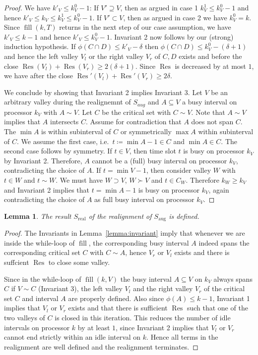 \documentclass[a4paper]{article}
\DeclareMathOperator{\aug}{aug}
\DeclareMathOperator{\real}{real}
\DeclareMathOperator{\fillop}{fill}
\DeclareMathOperator{\res}{Res}
\newtheorem{lemma}[theorem]{Lemma}
\begin{document}
\begin{proof}
      We have $k'_V \leq k^0_V - 1$:
      If $V' \supseteq V$, then as argued in case 1 $k^1_V \leq k^0_V - 1$ and hence $k'_V \leq k_V \leq k^1_V \leq k^0_V -1$.
      If $V' \subset V$, then as argued in case 2 we have $k^0_V = k$.
      Since $\fillop(k, T)$ returns in the next step of our case assumption, we have $k'_V \leq k - 1$ and hence $k'_V \leq k^0_V -1$.
      Invariant 2 now follows by our (strong) induction hypothesis.
      If $\phi(C \cap D) \leq k'_V - \delta$ then $\phi(C \cap D) \leq k^0_V - (\delta + 1)$ and hence the left valley $V_l$ or the right valley $V_r$ of $C, D$ exists and before the close $\res(V_l) + \res(V_r) \geq 2 (\delta + 1)$.
      Since $\res$ is decreased by at most $1$, we have after the close $\res'(V_l) + \res'(V_r) \geq 2 \delta$.

  We conclude by showing that Invariant 2 implies Invariant 3.
  Let $V$ be an arbitrary valley during the realignemnt of $S_{aug}$ and $A \subseteq V$ a busy interval on processor $k_V$ with $A \sim V$.
  Let $C$ be the critical set with $C \sim V$.
  Note that $A \sim V$ implies that $A$ intersects $C$.
  Assume for contradiction that $A$ does not span $C$.
  The $\min A$ is within subinterval of $C$ or symmetrically $\max A$ within subinterval of $C$.
  We assume the first case, i.e.\ $t\coloneqq \min A - 1 \in C$ and $\min A \in C$.
  The second case follows by symmetry.
  If $t \in V$, then time slot $t$ is busy on processor $k_V$ by Invariant 2.
  Therefore, $A$ cannot be a (full) busy interval on processor $k_V$, contradicting the choice of $A$.
  If $t = \min V-1$, then consider valley $W$ with $t \in W$ and $t \sim W$.
  We must have $W \supset V$, $W \succ V$ and $t \in C_W$.
  Therefore $k_W \geq k_V$ and Invariant 2 implies that $t = \min A - 1$ is busy on processor $k_V$, again contradicting the choice of $A$ as full busy interval on processor $k_V$.
\end{proof}

\begin{lemma}\label{lemma:s_real}
  The result $S_{\real}$ of the realignment of $S_{\aug}$ is defined.
\end{lemma}
\begin{proof}
  The Invariants in Lemma~\ref{lemma:invariant} imply that whenever we are inside the while-loop of $\fillop$, the corresponding busy interval $A$ indeed spans the corresponding critical set $C$ with $C \sim A$, hence $V_r$ or $V_l$ exists and there is suffcient $\res$ to close some valley.

  Since in the while-loop of $\fillop(k, V)$ the busy interval $A \subseteq V$ on $k_V$ always spans $C$ if $V \sim C$ (Invariant 3), the left valley $V_l$ and the right valley $V_r$ of the critical set $C$ and interval $A$ are properly defined.
  Also since $\phi(A) \leq k - 1$, Invariant 1 implies that $V_l$ or $V_r$ exists and that there is sufficient $\res$ such that one of the two valleys of $C$ is closed in this iteration.
  This reduces the number of idle intervals on processor $k$ by at least $1$, since Invariant 2 implies that $V_l$ or $V_r$ cannot end strictly within an idle interval on $k$.
  Hence all terms in the realignment are well defined and the realignment terminates.
\end{proof}
\end{document}
